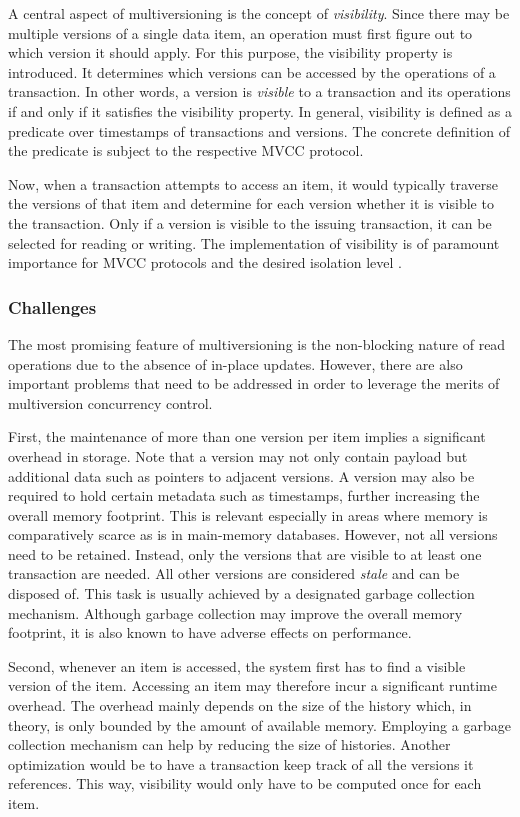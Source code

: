 A central aspect of multiversioning is the concept of \emph{visibility}. Since
there may be multiple versions of a single data item, an operation must first
figure out to which version it should apply. For this purpose, the visibility
property is introduced. It determines which versions can be accessed by the
operations of a transaction. In other words, a version is \emph{visible} to a
transaction and its operations if and only if it satisfies the visibility
property. In general, visibility is defined as a predicate over timestamps of
transactions and versions. The concrete definition of the predicate is subject
to the respective MVCC protocol.

Now, when a transaction attempts to access an item, it would typically traverse
the versions of that item and determine for each version whether it is visible
to the transaction. Only if a version is visible to the issuing transaction, it
can be selected for reading or writing. The implementation of visibility is of
paramount importance for MVCC protocols and the desired isolation level
\cite{larson2011high}.

\subsubsection{Challenges}

The most promising feature of multiversioning is the non-blocking nature of read
operations due to the absence of in-place updates. However, there are also
important problems that need to be addressed in order to leverage the merits of
multiversion concurrency control.

First, the maintenance of more than one version per item implies a significant
overhead in storage. Note that a version may not only contain payload but
additional data such as pointers to adjacent versions. A version may also be
required to hold certain metadata such as timestamps, further increasing the
overall memory footprint. This is relevant especially in areas where memory is
comparatively scarce as is in main-memory databases. However, not all versions
need to be retained. Instead, only the versions that are visible to at least one
transaction are needed. All other versions are considered \emph{stale} and can
be disposed of. This task is usually achieved by a designated garbage collection
mechanism. Although garbage collection may improve the overall memory footprint,
it is also known to have adverse effects on performance.

Second, whenever an item is accessed, the system first has to find a visible
version of the item. Accessing an item may therefore incur a significant runtime
overhead. The overhead mainly depends on the size of the history which, in
theory, is only bounded by the amount of available memory. Employing a garbage
collection mechanism can help by reducing the size of histories. Another
optimization would be to have a transaction keep track of all the versions it
references. This way, visibility would only have to be computed once for each
item.

